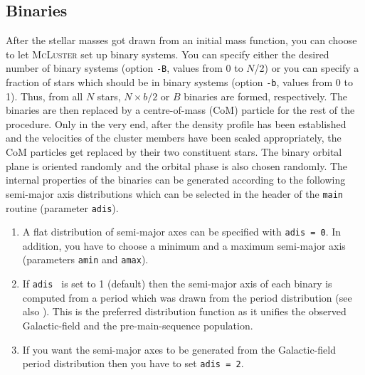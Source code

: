 \documentclass[useAMS,usenatbib]{mn2e}
\begin{document}
\subsection*{Binaries}
After the stellar masses got drawn from an initial mass function, you can choose to let \textsc{McLuster} set up binary systems. You can specify either the desired number of binary systems (option \texttt{-B}, values from 0 to $N$/2) or you can specify a fraction of stars which should be in binary systems (option \texttt{-b}, values from 0 to 1). Thus, from all $N$ stars, $N\times b/2$ or $B$ binaries are formed, respectively. The binaries are then replaced by a centre-of-mass (CoM) particle for the rest of the procedure. Only in the very end, after the density profile has been established and the velocities of the cluster members have been scaled appropriately, the CoM particles get replaced by their two constituent stars. The binary orbital plane is oriented randomly and the orbital phase is also chosen randomly. The internal properties of the binaries can be generated according to the following semi-major axis distributions which can be selected in the header of the \texttt{main} routine (parameter \texttt{adis}). 
\begin{enumerate}
\item A flat distribution of semi-major axes can be specified with \texttt{adis = 0}. In addition, you have to choose a minimum and a maximum semi-major axis (parameters \texttt{amin} and \texttt{amax}).
\item If \texttt{adis } is set to 1 (default) then the semi-major axis of each binary is computed from a period which was drawn from the \citet{Kroupa95a} period distribution (see also \citealt{Kroupa08}). This is the preferred distribution function as it unifies the observed Galactic-field and the pre-main-sequence population.
\item If you want the semi-major axes to be generated from the \citet{Duquennoy91} Galactic-field period distribution then you have to set \texttt{adis = 2}.
\end{enumerate}
\end{document}
